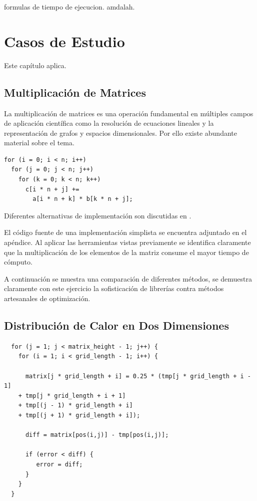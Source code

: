 \documentclass[a4paper]{report}
\begin{document}
\bigskip

formulas de tiempo de ejecucion. amdalah.

\chapter{Casos de Estudio}

Este cap\'itulo aplica.

\section{Multiplicaci\'on de Matrices}

La multiplicaci\'on de matrices es una operaci\'on fundamental en m\'ultiples
campos de aplicaci\'on cient\'ifica como la resoluci\'on de ecuaciones
lineales y la representaci\'on de grafos y espacios dimensionales. Por ello
existe abundante material sobre el tema.

\begin{verbatim}
for (i = 0; i < n; i++)
  for (j = 0; j < n; j++)
    for (k = 0; k < n; k++)
      c[i * n + j] += 
        a[i * n + k] * b[k * n + j];
\end{verbatim}

Diferentes alternativas de implementaci\'on son discutidas en
\cite{mm-matrixmultiplicationtool}.

\bigskip

El c\'odigo fuente de una implementaci\'on simplista se encuentra adjuntado en
el ap\'endice. Al aplicar las herramientas vistas previamente se identifica
claramente que la multiplicaci\'on de los elementos de la matriz consume el
mayor tiempo de c\'omputo.

\bigskip

A continuaci\'on se muestra una comparaci\'on de diferentes m\'etodos, se
demuestra claramente con este ejercicio la sofisticaci\'on de librer\'ias
contra m\'etodos artesanales de optimizaci\'on.

\section{Distribuci\'on de Calor en Dos Dimensiones}

\begin{verbatim}
  for (j = 1; j < matrix_height - 1; j++) {
    for (i = 1; i < grid_length - 1; i++) {
      
      matrix[j * grid_length + i] = 0.25 * (tmp[j * grid_length + i - 1]
    + tmp[j * grid_length + i + 1]
    + tmp[(j - 1) * grid_length + i]
    + tmp[(j + 1) * grid_length + i]);

      diff = matrix[pos(i,j)] - tmp[pos(i,j)];

      if (error < diff) {
         error = diff;
      }
    }
  }
\end{verbatim}
\end{document}
